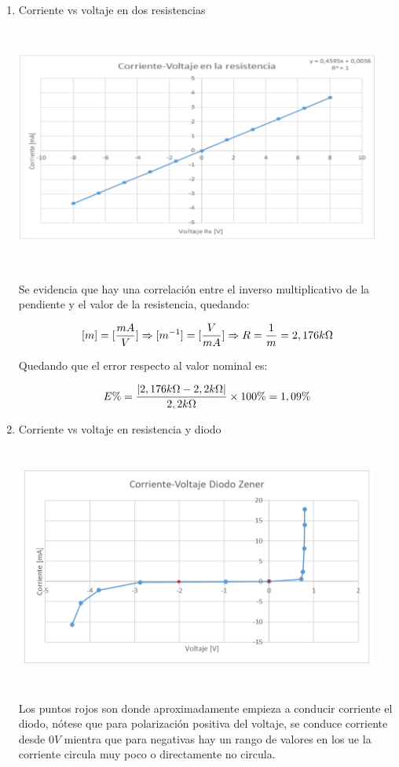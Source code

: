 \documentclass[12pt]{article}
\begin{document}
	\begin{enumerate}
		\item Corriente vs voltaje en dos resistencias
		
		\includegraphics[width=12cm,height=8cm]{Img/graph_1}
		
		\noindent Se evidencia que hay una correlación entre el inverso multiplicativo de la pendiente y el valor de la resistencia, quedando:
		
		\begin{equation}
			\notag [m] = [\frac{mA}{V}] \Rightarrow [m^{-1}] = [\frac{V}{mA}] \Rightarrow R = \frac{1}{m} =  2,176k \Omega
		\end{equation}
	
		\noindent Quedando que el error respecto al valor nominal es:
		
		\begin{equation}
			\notag E\% = \frac{|2,176k\Omega - 2,2k\Omega|}{2,2k\Omega}\times 100\% = 1,09\% 
		\end{equation}
	
		\newpage
		
		\item Corriente vs voltaje en resistencia y diodo
		
		\includegraphics[width=12cm,height=8cm]{Img/graph_2}
		
		\noindent Los puntos rojos son donde aproximadamente empieza a conducir corriente el diodo, nótese que para polarización positiva del voltaje, se conduce corriente desde $0V$ mientra que para negativas hay un rango de valores en los ue la corriente circula muy poco o directamente no circula.
		
	\end{enumerate}
\end{document}
